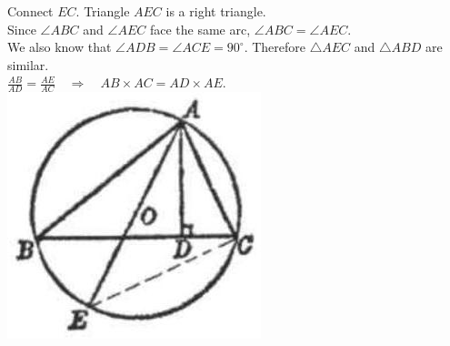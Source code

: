 \documentclass{article}
\begin{document}
Connect \(E C\). Triangle \(A E C\) is a right triangle.\\
Since \(\angle A B C\) and \(\angle A E C\) face the same arc, \(\angle A B C=\angle A E C\).\\
We also know that \(\angle A D B=\angle A C E=90^{\circ}\). Therefore \(\triangle A E C\) and \(\triangle A B D\) are similar.\\
\(\frac{A B}{A D}=\frac{A E}{A C} \quad \Rightarrow \quad A B \times A C=A D \times A E\).\\
\centering
\includegraphics[width=\textwidth]{images/173.jpg}
\end{document}

